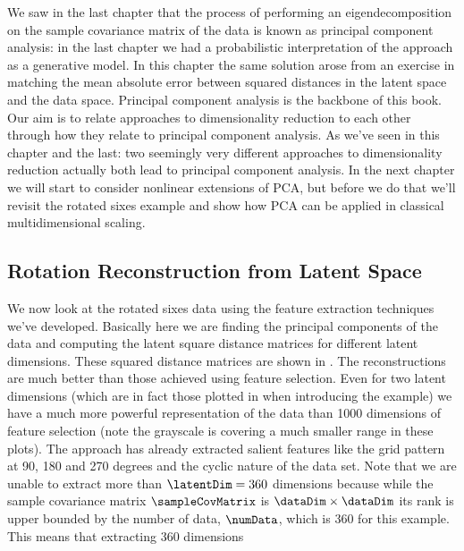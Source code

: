 We saw in the last chapter that the process of performing an
eigendecomposition on the sample covariance matrix of the data is
known as principal component analysis: in the last chapter we had a probabilistic
interpretation of the approach as a generative model. In this chapter
the same solution arose from an exercise in matching the mean absolute
error between squared distances in the latent space and the data
space. Principal component analysis is the backbone of this book. Our
aim is to relate approaches to dimensionality reduction to each other
through how they relate to principal component analysis. As we've seen
in this chapter and the last: two seemingly very different approaches
to dimensionality reduction actually both lead to principal component
analysis. In the next
chapter we will start to consider nonlinear extensions of PCA, but
before we do that we'll revisit the rotated sixes example and show how
PCA can be applied in classical multidimensional
scaling.

\subsection{Rotation Reconstruction from Latent Space}

We now look at the rotated sixes data using the feature extraction
techniques we've developed. Basically here we are finding the
principal components of the data and computing the latent square
distance matrices for different latent dimensions. These squared
distance matrices are shown in . The
reconstructions are much better than those achieved using feature
selection. Even for two latent dimensions (which are in fact those
plotted in  when introducing the example) we
have a much more powerful representation of the data than 1000
dimensions of feature selection (note the grayscale is covering a much
smaller range in these plots). The approach has already extracted
salient features like the grid pattern at 90, 180 and 270 degrees and
the cyclic nature of the data set. Note that we are unable to extract
more than $\latentDim=360$ dimensions because while the sample
covariance matrix $\sampleCovMatrix$ is $\dataDim \times \dataDim$ its
rank is upper bounded by the number of data, $\numData$, which is 360
for this example. This means that extracting 360 dimensions

